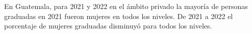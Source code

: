En Guatemala, para 2021 y 2022 en el ámbito privado la mayoría de personas graduadas en 2021 fueron mujeres en todos los niveles. De 2021 a 2022 el porcentaje de mujeres graduadas disminuyó para todos los niveles. 
